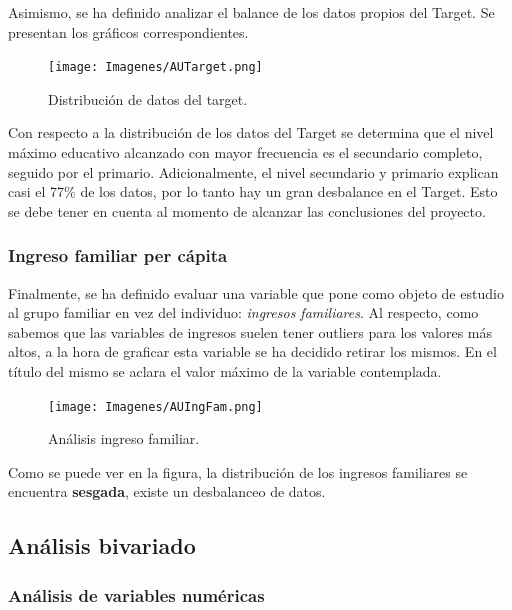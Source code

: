 \documentclass[a4paper]{article}
\begin{document}
            Asimismo, se ha definido analizar el balance de los datos propios del Target. Se presentan los gráficos correspondientes.
            
            \begin{figure}[H]
                \centering
                \texttt{[image: Imagenes/AUTarget.png]} 
                \caption{Distribución de datos del target.}
                \label{AU Target}
            \end{figure}
           
            Con respecto a la distribución de los datos del Target se determina que el nivel máximo educativo alcanzado con mayor frecuencia es el secundario completo, seguido por el primario. Adicionalmente, el nivel secundario y primario explican casi el 77\% de los datos, por lo tanto hay un gran desbalance en el Target. Esto se debe tener en cuenta al momento de alcanzar las conclusiones del proyecto.
           
           \subsubsection{Ingreso familiar per cápita}
           
            Finalmente, se ha definido evaluar una variable que pone como objeto de estudio al grupo familiar en vez del individuo: \textit{ingresos familiares}. Al respecto,  como sabemos que las variables de ingresos suelen tener outliers para los valores más altos, a la hora de graficar esta variable se ha decidido retirar los mismos. En el título del mismo se aclara el valor máximo de la variable contemplada.
           
            \begin{figure}[H]
                \centering
                \texttt{[image: Imagenes/AUIngFam.png]}
                \caption{Análisis ingreso familiar.}
                \label{AU Family income}
            \end{figure}
           
             Como se puede ver en la figura, la distribución de los ingresos familiares se encuentra \textbf{sesgada}, existe un desbalanceo de datos.
    
    \subsection{Análisis bivariado}

        \subsubsection{Análisis de variables numéricas}
 
\end{document}
